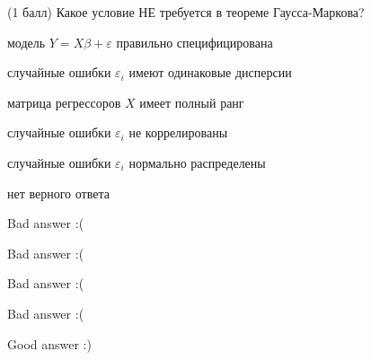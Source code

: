 
\begin{question}
(1 балл) Какое условие НЕ требуется в теореме Гаусса-Маркова?
\begin{answerlist}[2]
  \item модель \(Y=X\beta + \varepsilon\) правильно специфицирована
  \item случайные ошибки \(\varepsilon_i\) имеют одинаковые дисперсии
  \item матрица регрессоров \(X\) имеет полный ранг
  \item случайные ошибки \(\varepsilon_i\) не коррелированы
  \item случайные ошибки \(\varepsilon_i\) нормально распределены
  \item нет верного ответа
\end{answerlist}
\end{question}

\begin{solution}
\begin{answerlist}
  \item Bad answer :(
  \item Bad answer :(
  \item Bad answer :(
  \item Bad answer :(
  \item Good answer :)
\end{answerlist}
\end{solution}
